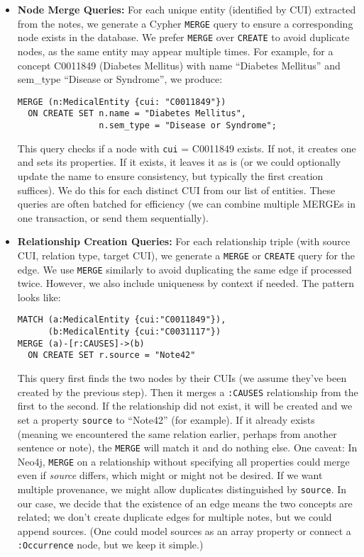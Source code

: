 \begin{itemize}
\item \textbf{Node Merge Queries:} For each unique entity (identified by CUI) extracted from the notes, we generate a Cypher \texttt{MERGE} query to ensure a corresponding node exists in the database. We prefer \texttt{MERGE} over \texttt{CREATE} to avoid duplicate nodes, as the same entity may appear multiple times. For example, for a concept C0011849 (Diabetes Mellitus) with name ``Diabetes Mellitus'' and sem\_type ``Disease or Syndrome'', we produce:

\begin{verbatim}
MERGE (n:MedicalEntity {cui: "C0011849"})
  ON CREATE SET n.name = "Diabetes Mellitus", 
                n.sem_type = "Disease or Syndrome";
\end{verbatim}

  This query checks if a node with \texttt{cui} = C0011849 exists. If not, it creates one and sets its properties. If it exists, it leaves it as is (or we could optionally update the name to ensure consistency, but typically the first creation suffices). We do this for each distinct CUI from our list of entities. These queries are often batched for efficiency (we can combine multiple MERGEs in one transaction, or send them sequentially).

\item \textbf{Relationship Creation Queries:} For each relationship triple (with source CUI, relation type, target CUI), we generate a \texttt{MERGE} or \texttt{CREATE} query for the edge. We use \texttt{MERGE} similarly to avoid duplicating the same edge if processed twice. However, we also include uniqueness by context if needed. The pattern looks like:

\begin{verbatim}
MATCH (a:MedicalEntity {cui:"C0011849"}), 
      (b:MedicalEntity {cui:"C0031117"})
MERGE (a)-[r:CAUSES]->(b)
  ON CREATE SET r.source = "Note42"
\end{verbatim}

  This query first finds the two nodes by their CUIs (we assume they've been created by the previous step). Then it merges a \texttt{:CAUSES} relationship from the first to the second. If the relationship did not exist, it will be created and we set a property \texttt{source} to ``Note42'' (for example). If it already exists (meaning we encountered the same relation earlier, perhaps from another sentence or note), the \texttt{MERGE} will match it and do nothing else. One caveat: In Neo4j, \texttt{MERGE} on a relationship without specifying all properties could merge even if \textit{source} differs, which might or might not be desired. If we want multiple provenance, we might allow duplicates distinguished by \texttt{source}. In our case, we decide that the existence of an edge means the two concepts are related; we don't create duplicate edges for multiple notes, but we could append sources. (One could model sources as an array property or connect a \texttt{:Occurrence} node, but we keep it simple.)


\end{itemize}
